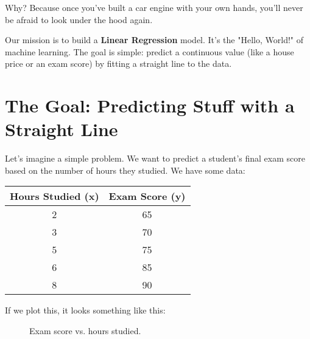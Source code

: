 \documentclass[11pt, letterpaper, openany]{book}
\begin{document}
Why? Because once you've built a car engine with your own hands, you'll never be afraid to look under the hood again.

Our mission is to build a \textbf{Linear Regression} model. It's the "Hello, World!" of machine learning. The goal is simple: predict a continuous value (like a house price or an exam score) by fitting a straight line to the data.

\section{The Goal: Predicting Stuff with a Straight Line}

Let's imagine a simple problem. We want to predict a student's final exam score based on the number of hours they studied. We have some data:

\begin{table}[h!]
\centering
\begin{tabular}{cc}
\hline
\textbf{Hours Studied (x)} & \textbf{Exam Score (y)} \\
\hline
2 & 65 \\
3 & 70 \\
5 & 75 \\
6 & 85 \\
8 & 90 \\
\hline
\end{tabular}
\end{table}

If we plot this, it looks something like this:

\begin{figure}[h!]
\centering
{}
\caption{Exam score vs. hours studied.}
\end{figure}
\end{document}
